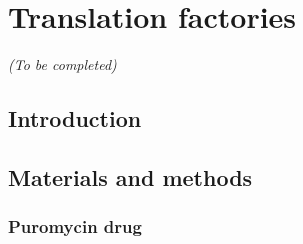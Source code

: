 
\section{Translation factories}
\label{sec:translation_factories}

\begin{center}
	\textit{(To be completed)}
\end{center}

\subsection{Introduction}
\label{subsec:introduction_translation_factories}

\subsection{Materials and methods}
\label{subsec:materials_translation_factories}

\subsubsection{Puromycin drug}

